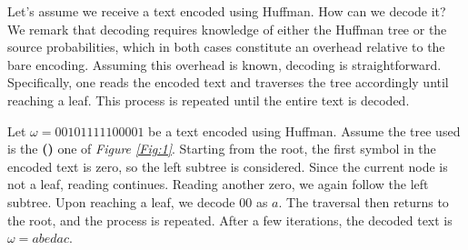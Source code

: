 \documentclass{subfiles}
\begin{document}
    Let's assume we receive a text encoded using Huffman. How can we decode it?
    We remark that decoding requires knowledge of either the Huffman tree 
        or the source probabilities, which in both cases constitute an overhead
        relative to the bare encoding.
    Assuming this overhead is known, decoding is straightforward.
    Specifically, one reads the encoded text and traverses the tree accordingly 
    until reaching a leaf. This process is repeated until the entire text is decoded.

    \begin{example*}
        Let \(\omega = 00101111100001\) be a text encoded using Huffman.
        Assume the tree used is the \textbf{()} one of \emph{Figure \ref{Fig:1}}.
        Starting from the root, the first symbol in the encoded text is zero,
        so the left subtree is considered. 
        Since the current node is not a leaf, reading continues.
        Reading another zero, we again follow the left subtree.
        Upon reaching a leaf, we decode \(00\) as \(a\). 
        The traversal then returns to the root, and the process is repeated. 
        After a few iterations, the decoded text is \(\omega = abedac\).
    \end{example*}
\end{document}
